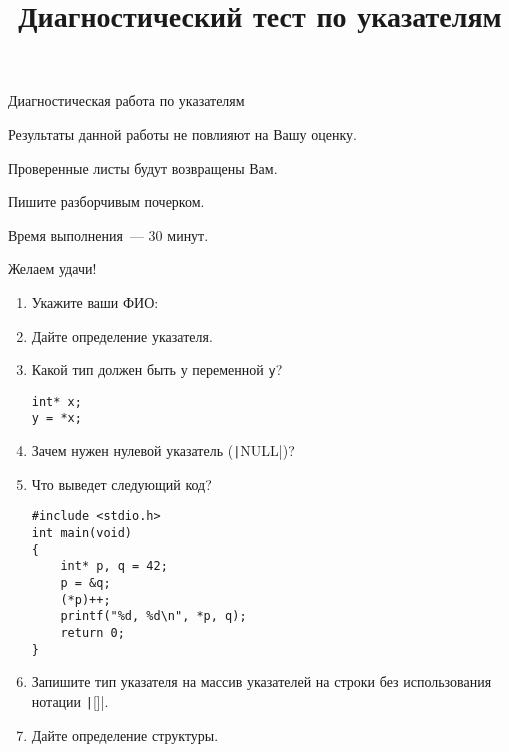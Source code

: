 \documentclass[12pt]{scrartcl}
\title{Диагностический тест по указателям}
\date{}
\begin{document}

\begin{center}
    \huge Диагностическая работа по указателям
\end{center}


\begin{center}
    \itshape

    Результаты данной работы не повлияют на Вашу оценку.

    Проверенные листы будут возвращены Вам.

    Пишите разборчивым почерком.

    Время выполнения~--- 30 минут.

    Желаем удачи!
\end{center}

\begin{enumerate}
    \item Укажите ваши ФИО: \hrulefill
    \item Дайте определение указателя.

          \noindent\makebox[\linewidth]{\rule{\linewidth}{0.4pt}}

          \noindent\makebox[\linewidth]{\rule{\linewidth}{0.4pt}}

          \noindent\makebox[\linewidth]{\rule{\linewidth}{0.4pt}}

    \item Какой тип должен быть у переменной \texttt{y}? \hrulefill
          \begin{verbatim}
int* x;
y = *x;
        \end{verbatim}
    \item Зачем нужен нулевой указатель (\texttt|NULL|)?

          \noindent\makebox[\linewidth]{\rule{\linewidth}{0.4pt}}

          \noindent\makebox[\linewidth]{\rule{\linewidth}{0.4pt}}

          \noindent\makebox[\linewidth]{\rule{\linewidth}{0.4pt}}
    \item Что выведет следующий код? \hrulefill
          \begin{verbatim}
#include <stdio.h>
int main(void)
{
    int* p, q = 42;
    p = &q;
    (*p)++;
    printf("%d, %d\n", *p, q);
    return 0;
}
        \end{verbatim}
    \item Запишите тип указателя на массив указателей на строки без использования нотации \texttt|[]|. \hrulefill
    \item Дайте определение структуры.


\end{enumerate}
\end{document}
